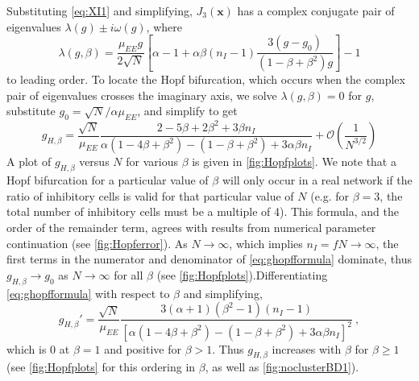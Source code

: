 \documentclass[11pt,reqno]{amsart}
\newcommand{\xvec}{\mathbf{x}}
\begin{document}
Substituting \cref{eq:XI1} and simplifying, $J_3(\xvec)$ has a complex conjugate pair of eigenvalues $\lambda(g) \pm i \omega(g)$, where
\begin{equation}\label{eq:lambdagbeta}
\lambda(g, \beta) = \frac{\mu_{EE} g}{2 \sqrt{N}}\left[ \alpha - 1 + \alpha \beta (n_I-1) \frac{ 3(g - g_0) }{ (1 - \beta + \beta^2 )g} \right] - 1
\end{equation}
to leading order. To locate the Hopf bifurcation, which occurs when the complex pair of eigenvalues crosses the imaginary axis, we solve $\lambda(g, \beta) = 0$ for $g$, substitute $g_0 = \sqrt{N}/\alpha \mu_{EE}$, and simplify to get
\begin{equation}\label{eq:ghopfformula}
    g_{H,\beta} = 
    \frac{\sqrt{N}}{\mu_{EE}} 
    \frac{ 2 - 5\beta + 2 \beta^2 + 3 \beta n_I}
    { \alpha(1 - 4 \beta + \beta^2) - (1 - \beta + \beta^2) + 3 \alpha \beta n_I }
    + \mathcal{O}\left( \frac{1}{N^{3/2}} \right)
\end{equation}
A plot of $g_{H,\beta}$ versus $N$ for various $\beta$ is given in \cref{fig:Hopfplots}. We note that a Hopf bifurcation for a particular value of $\beta$ will only occur in a real network if the ratio of inhibitory cells is valid for that particular value of $N$ (e.g. for $\beta = 3$, the total number of inhibitory cells must be a multiple of 4). This formula, and the order of the remainder term, agrees with results from numerical parameter continuation (see \cref{fig:Hopferror}). As $N \rightarrow \infty$, which implies $n_I = f N \rightarrow \infty$, the first terms in the numerator and denominator of \cref{eq:ghopfformula} dominate, thus $g_{H,\beta}  \rightarrow g_0$ as $N \rightarrow \infty$ for all $\beta$ (see \cref{fig:Hopfplots}).Differentiating \cref{eq:ghopfformula} with respect to $\beta$ and simplifying,
\begin{equation}\label{eq:gprime}
g_{H,\beta}' = \frac{ \sqrt{N} }{ \mu_{EE} }
    \frac{ 
    3(\alpha+1)(\beta^2-1)(n_I-1)
    }
    { 
        \left[ \alpha(1 - 4 \beta + \beta^2) - (1 - \beta + \beta^2) + 3 \alpha \beta n_I \right]^2
    }\:,
\end{equation}
which is 0 at $\beta = 1$ and positive for $\beta > 1$. Thus $g_{H,\beta}$ increases with $\beta$ for $\beta \geq 1$ (see \cref{fig:Hopfplots} for this ordering in $\beta$, as well as \cref{fig:noclusterBD1}). 
\end{document}
